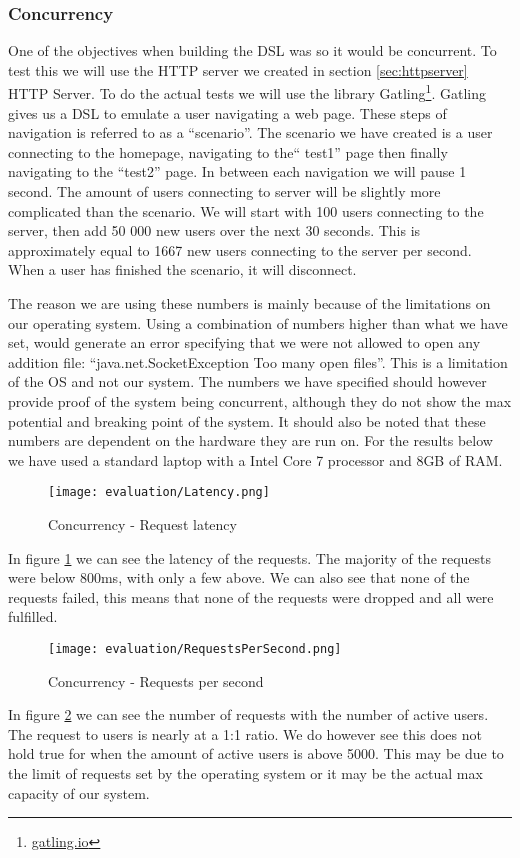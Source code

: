 \subsubsection{Concurrency}
One of the objectives when building the DSL was so it would be concurrent. To test this we will use the HTTP server we created in section \ref{sec:httpserver} HTTP Server. To do the actual tests we will use the library Gatling\footnote{\href{www.gatling.io}{gatling.io}}. Gatling gives us a DSL to emulate a user navigating a web page. These steps of navigation is referred to as a ``scenario''. The scenario we have created is a user connecting to the homepage, navigating to the`` test1'' page then finally navigating to the ``test2'' page. In between each navigation we will pause 1 second. The amount of users connecting to server will be slightly more complicated than the scenario. We will start with 100 users connecting to the server, then add 50 000 new users over the next 30 seconds. This is approximately equal to 1667 new users connecting to the server per second. When a user has finished the scenario, it will disconnect. 

The reason we are using these numbers is mainly because of the limitations on our operating system. Using a combination of numbers higher than what we have set, would generate an error specifying that we were not allowed to open any addition file: ``java.net.SocketException Too many open files''. This is a limitation of the OS and not our system. The numbers we have specified should however provide proof of the system being concurrent, although they do not show the max potential and breaking point of the system. It should also be noted that these numbers are dependent on the hardware they are run on. For the results below we have used a standard laptop with a Intel Core 7 processor and 8GB of RAM.

\begin{figure}[H]
  \centering
  \texttt{[image: evaluation/Latency.png]}
  \caption{Concurrency - Request latency}
  \label{fig:latency}
\end{figure}
In figure \ref{fig:latency} we can see the latency of the requests. The majority of the requests were below 800ms, with only a few above. We can also see that none of the requests failed, this means that none of the requests were dropped and all were fulfilled.

\begin{figure}[H]
  \centering
  \texttt{[image: evaluation/RequestsPerSecond.png]}
  \caption{Concurrency - Requests per second}
  \label{fig:requestspersecond}
\end{figure}
In figure \ref{fig:requestspersecond} we can see the number of requests with the number of active users. The request to users is nearly at a 1:1 ratio. We do however see this does not hold true for when the amount of active users is above 5000. This may be due to the limit of requests set by the operating system or it may be the actual max capacity of our system. 


